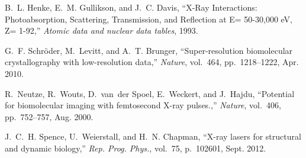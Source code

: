 \documentclass [11pt,fleqn]{article}
\begin{document}
\begin{thebibliography}{10}
B.~L. Henke, E.~M. Gullikson, and J.~C. Davis, ``{X-Ray Interactions:
  Photoabsorption, Scattering, Transmission, and Reflection at E= 50-30,000 eV,
  Z= 1-92},'' {\em Atomic data and nuclear data tables}, 1993.

G.~F. Schr{\"o}der, M.~Levitt, and A.~T. Brunger, ``{Super-resolution
  biomolecular crystallography with low-resolution data},'' {\em Nature},
  vol.~464, pp.~1218--1222, Apr. 2010.

R.~Neutze, R.~Wouts, D.~van~der Spoel, E.~Weckert, and J.~Hajdu, ``{Potential
  for biomolecular imaging with femtosecond X-ray pulses.},'' {\em Nature},
  vol.~406, pp.~752--757, Aug. 2000.

J.~C.~H. Spence, U.~Weierstall, and H.~N. Chapman, ``{X-ray lasers for
  structural and dynamic biology},'' {\em Rep. Prog. Phys.}, vol.~75,
  p.~102601, Sept. 2012.

\end{thebibliography}

%
%
\end{document}
